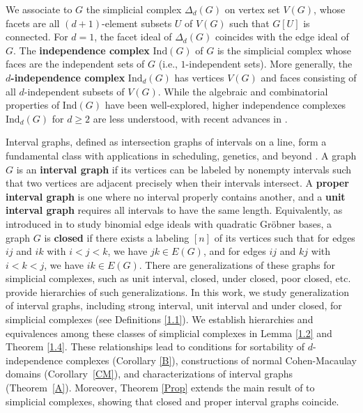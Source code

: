 \documentclass[12pt,reqno]{amsart}
\theoremstyle{plain}
\theoremstyle{definition}
\numberwithin{equation}{section}
\begin{document}
We associate to $G$ the simplicial complex $\Delta_d(G)$ on vertex set $V(G)$, whose facets are all $(d+1)$-element subsets $U $ of $V(G)$ such that $G[U]$ is connected. For $d=1$, the facet ideal of $\Delta_d(G)$ coincides with the edge ideal of $G$.
The \textbf{independence complex} $\mathrm{Ind}(G)$ of $G$ is the simplicial complex whose faces are the independent sets of $G$ (i.e., $1$-independent sets). More generally, the \textbf{$d$-independence complex} $\mathrm{Ind}_d(G)$ has vertices $V(G)$ and faces consisting of all $d$-independent subsets of $V(G)$. While the algebraic and combinatorial properties of $\mathrm{Ind}(G)$ have been well-explored,
higher independence complexes $\mathrm{Ind}_d(G)$ for $d \geq 2$ are less understood, with recent advances in \cite{DSS, DS, Roy}. 

Interval graphs, defined as intersection graphs of intervals on a line, form a fundamental class with applications in scheduling, genetics, and beyond \cite{Gardi, G, R2}. A graph $G$ is an \textbf{interval graph} if its vertices can be labeled by nonempty intervals such that two vertices are adjacent precisely when their intervals intersect. A \textbf{proper interval graph} is one where no interval properly contains another, and a \textbf{unit interval graph} requires all intervals to have the same length. Equivalently, as introduced in \cite{Herzog1} to study binomial edge ideals with quadratic Gr\"{o}bner bases, a graph $G$ is \textbf{closed} if there exists a labeling $[n]$ of its vertices such that for edges $ij$ and $ik$ with $i < j < k$, we have $jk \in E(G)$, and for edges $ij$ and $kj$ with $i < k < j$, we have $ik \in E(G)$.  There are generalizations of these graphs for simplicial complexes, such as unit interval, closed, under closed, poor closed, etc. \cite{B+S+V, Fahimeh2} provide hierarchies of such generalizations. In this work, we study generalization of interval graphs, including strong interval, unit interval and under closed, for simplicial complexes (see Definitions \ref{1.1}). We establish hierarchies and equivalences among these classes of simplicial complexes in Lemma \ref{1.2} and Theorem \ref{1.4}.  These relationships lead to conditions for  sortability of $d$-independence complexes (Corollary \ref{B}), constructions of normal Cohen-Macaulay domains (Corollary~\ref{CM}), and characterizations of interval graphs (Theorem~\ref{A}). Moreover, Theorem \ref{Prop} extends the main result of \cite{C+R} to simplicial complexes, showing that closed and proper interval graphs coincide. 
\end{document}

